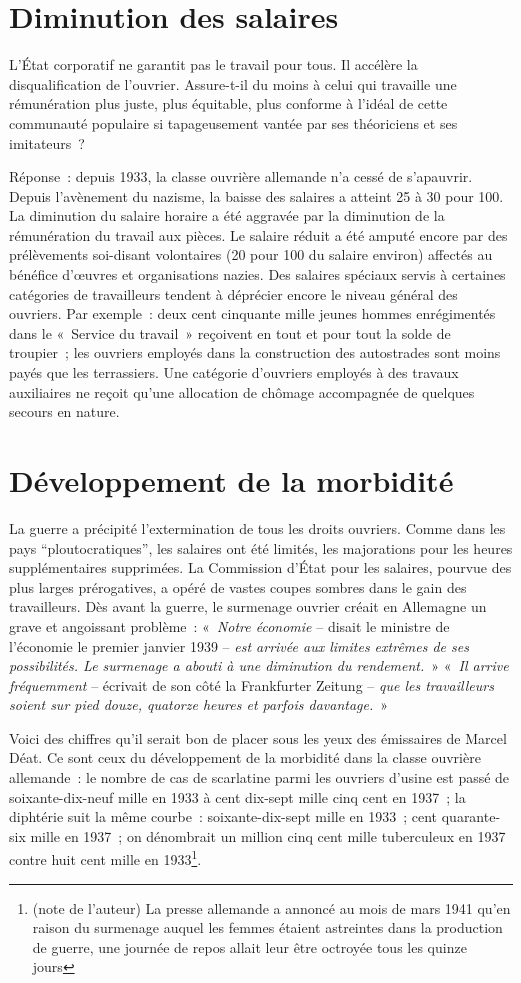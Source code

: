 \documentclass[french,twoside]{book} %
\begin{document}
\section[Diminution des salaires]{Diminution des salaires}
\noindent L’État corporatif ne garantit pas le travail pour tous. Il accélère la disqualification de l’ouvrier. Assure-t-il du moins à celui qui travaille une rémunération plus juste, plus équitable, plus conforme à l’idéal de cette communauté populaire si tapageusement vantée par ses théoriciens et ses imitateurs ?\par
Réponse : depuis 1933, la classe ouvrière allemande n’a cessé de s’apauvrir. Depuis l’avènement du nazisme, la baisse des salaires a atteint 25 à 30 pour 100. La diminution du salaire horaire a été aggravée par la diminution de la rémunération du travail aux pièces. Le salaire réduit a été amputé encore par des prélèvements soi-disant volontaires (20 pour 100 du salaire environ) affectés au bénéfice d’œuvres et organisations nazies. Des salaires spéciaux servis à certaines catégories de travailleurs tendent à déprécier encore le niveau général des ouvriers. Par exemple : deux cent cinquante mille jeunes hommes enrégimentés dans le « Service du travail » reçoivent en tout et pour tout la solde de troupier ; les ouvriers employés dans la construction des autostrades sont moins payés que les terrassiers. Une catégorie d’ouvriers employés à des travaux auxiliaires ne reçoit qu’une allocation de chômage accompagnée de quelques secours en nature.
\section[Développement de la morbidité]{Développement de la morbidité}
\noindent La guerre a précipité l’extermination de tous les droits ouvriers. Comme dans les pays “ploutocratiques”, les salaires ont été limités, les majorations pour les heures supplémentaires supprimées. La Commission d’État pour les salaires, pourvue des plus larges prérogatives, a opéré de vastes coupes sombres dans le gain des travailleurs. Dès avant la guerre, le surmenage ouvrier créait en Allemagne un grave et angoissant problème : « \emph{Notre économie} – disait le ministre de l’économie le premier janvier 1939 – \emph{est arrivée aux limites extrêmes de ses possibilités. Le surmenage a abouti à une diminution du rendement.} » « \emph{Il arrive fréquemment} – écrivait de son côté la Frankfurter Zeitung – \emph{que les travailleurs soient sur pied douze, quatorze heures et parfois davantage.} »\par
Voici des chiffres qu’il serait bon de placer sous les yeux des émissaires de Marcel Déat. Ce sont ceux du développement de la morbidité dans la classe ouvrière allemande : le nombre de cas de scarlatine parmi les ouvriers d’usine est passé de soixante-dix-neuf mille en 1933 à cent dix-sept mille cinq cent en 1937 ; la diphtérie suit la même courbe : soixante-dix-sept mille en 1933 ; cent quarante-six mille en 1937 ; on dénombrait un million cinq cent mille tuberculeux en 1937 contre huit cent mille en 1933\footnote{(note de l’auteur) La presse allemande a annoncé au mois de mars 1941 qu’en raison du surmenage auquel les femmes étaient astreintes dans la production de guerre, une journée de repos allait leur être octroyée tous les quinze jours}.
\end{document}

